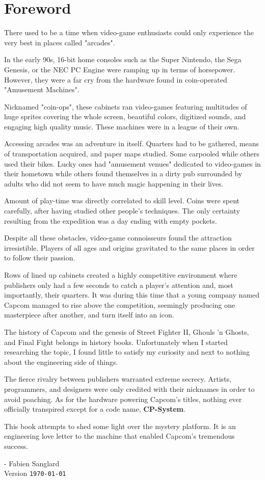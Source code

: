 \chapter*{Foreword}

There used to be a time when video-game enthusiasts could only experience the very best in places called "arcades". 

In the early 90s, 16-bit home consoles such as the Super Nintendo, the Sega Genesis, or the NEC PC Engine were ramping up in terms of horsepower. However, they were a far cry from the hardware found in coin-operated "Amusement Machines".

Nicknamed "coin-ops", these cabinets ran video-games featuring multitudes of huge sprites covering the whole screen, beautiful colors, digitized sounds, and engaging high quality music. These machines were in a league of their own.

Accessing arcades was an adventure in itself. Quarters had to be gathered, means of transportation acquired, and paper maps studied. Some carpooled while others used their bikes. Lucky ones had "amusement venues" dedicated to video-games in their hometown while others found themselves in a dirty pub surrounded by adults who did not seem to have much magic happening in their lives. 

Amount of play-time was directly correlated to skill level. Coins were spent carefully, after having studied other people's techniques. The only certainty resulting from the expedition was a day ending with empty pockets. 

Despite all these obstacles, video-game connoisseurs found the attraction irresistible. Players of all ages and origins gravitated to the same places in order to follow their passion. 

Rows of lined up cabinets created a highly competitive environment where publishers only had a few seconds to catch a player's attention and, most importantly, their quarters. It was during this time that a young company named Capcom  managed to rise above the competition, seemingly producing one masterpiece after another, and turn itself into an icon.

The history of Capcom and the genesis of Street Fighter II, Ghouls 'n Ghosts, and Final Fight belongs in history books. Unfortunately when I started researching the topic, I found little to satisfy my curiosity and next to nothing about the engineering side of things. 

The fierce rivalry between publishers warranted extreme secrecy. Artists, programmers, and designers were only credited with their nicknames in order to avoid poaching. As for the hardware powering Capcom's titles, nothing ever officially transpired except for a code name, \textbf{CP-System}.

This book attempts to shed some light over the mystery platform. It is an engineering love letter to the machine that enabled Capcom's tremendous success. 

- Fabien Sanglard\\

 Version \texttt{\monthyeardate\today}
